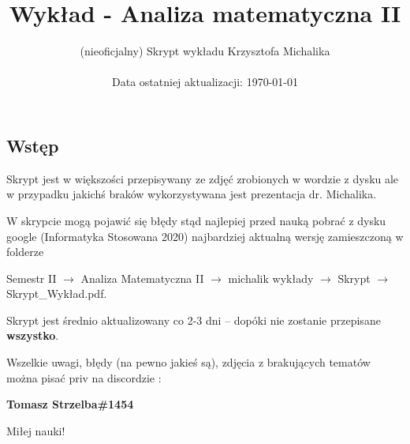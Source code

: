 \documentclass[12pt]{report}
\author{(nieoficjalny) Skrypt wykładu Krzysztofa Michalika \\ \\ Data ostatniej aktualizacji: \today}
\date{}
\title{Wykład - Analiza matematyczna II}
\begin{document}
\maketitle
\tableofcontents

\pagebreak

\subsection{Wstęp}

Skrypt jest w większości przepisywany ze zdjęć zrobionych w wordzie z dysku ale w przypadku jakichś braków wykorzystywana jest
prezentacja dr. Michalika. 

W skrypcie mogą pojawić się błędy stąd najlepiej przed nauką pobrać z dysku google \linebreak (Informatyka Stosowana 2020) najbardziej aktualną wersję
zamieszczoną w folderze 

Semestr II $\rightarrow$ Analiza Matematyczna II $\rightarrow$ michalik wykłady $\rightarrow$ Skrypt $\rightarrow$ Skrypt\_Wykład.pdf.

Skrypt jest średnio aktualizowany co 2-3 dni -- dopóki nie zostanie przepisane \textbf{wszystko}. \medskip

Wszelkie uwagi, błędy (na pewno jakieś są), zdjęcia z brakujących tematów można pisać priv na discordzie : 

\textbf{Tomasz Strzelba\#1454}

Miłej nauki!

\pagebreak


\pagebreak


\pagebreak


\pagebreak


\pagebreak


\pagebreak


\pagebreak
\end{document}
